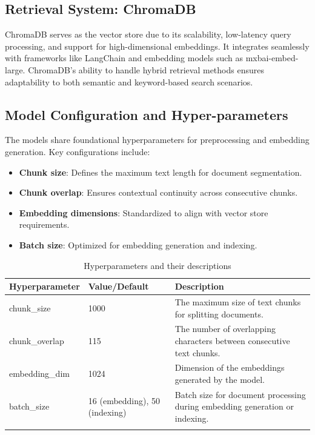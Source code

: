 \documentclass[pdflatex,sn-mathphys-num]{sn-jnl}%
\begin{document}
\subsection{Retrieval System: ChromaDB}\label{subsec2}
ChromaDB serves as the vector store due to its scalability, low-latency query processing, and support for high-dimensional embeddings. It integrates seamlessly with frameworks like LangChain and embedding models such as mxbai-embed-large. ChromaDB's ability to handle hybrid retrieval methods ensures adaptability to both semantic and keyword-based search scenarios.


\subsection{Model Configuration and Hyper-parameters}\label{subsec2}
The models share foundational hyperparameters for preprocessing and embedding generation. Key configurations include:
\begin{itemize}
    \item \textbf{Chunk size}: Defines the maximum text length for document segmentation.
    \item \textbf{Chunk overlap}: Ensures contextual continuity across consecutive chunks.
    \item \textbf{Embedding dimensions}: Standardized to align with vector store requirements.
    \item \textbf{Batch size}: Optimized for embedding generation and indexing.
\end{itemize}


\begin{table}[h]
\caption{Hyperparameters and their descriptions}\label{tab1}%
\begin{tabular}{@{}p{}p{}p{}@{}}
\toprule
\textbf{Hyperparameter} & \textbf{Value/Default} & \textbf{Description} \\
\midrule
chunk\_size & 1000 & The maximum size of text chunks for splitting documents. \\
chunk\_overlap & 115 & The number of overlapping characters between consecutive text chunks. \\
embedding\_dim & 1024 & Dimension of the embeddings generated by the model. \\
batch\_size & 16 (embedding), 50 (indexing) & Batch size for document processing during embedding generation or indexing. \\
\botrule
\end{tabular}
\end{table}
\end{document}
